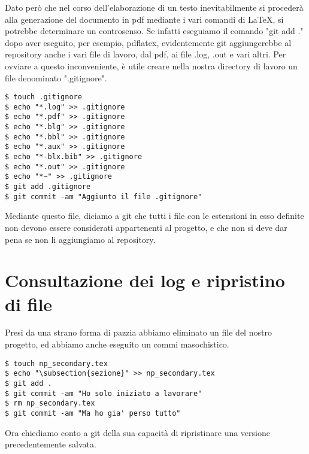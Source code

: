 \documentclass{article}
\begin{document}
Dato però che nel corso dell'elaborazione di un testo inevitabilmente si
procederà alla generazione del documento in pdf mediante i vari comandi di
\LaTeX, si potrebbe determinare un controsenso. Se infatti eseguiamo il comando
"git add ." dopo aver eseguito,
per esempio, pdflatex, evidentemente git aggiungerebbe al repository anche i
vari file di lavoro, dal pdf, ai file .log, .out e vari altri.
Per ovviare a questo inconveniente, è utile creare nella nostra directory di
lavoro un file denominato ".gitignore".

\begin{lstlisting}
$ touch .gitignore
$ echo "*.log" >> .gitignore
$ echo "*.pdf" >> .gitignore
$ echo "*.blg" >> .gitignore
$ echo "*.bbl" >> .gitignore
$ echo "*.aux" >> .gitignore
$ echo "*-blx.bib" >> .gitignore
$ echo "*.out" >> .gitignore
$ echo "*~" >> .gitignore
$ git add .gitignore
$ git commit -am "Aggiunto il file .gitignore"
\end{lstlisting}

Mediante questo file, diciamo a git che tutti i file con le estensioni in esso
definite non devono essere considerati appartenenti al progetto, e che non si
deve dar pena se non li aggiungiamo al repository.

\section{Consultazione dei log e ripristino di file}
Presi da una strano forma di pazzia abbiamo eliminato un file del nostro
progetto, ed abbiamo anche eseguito un commi masochistico.

\begin{lstlisting}
$ touch np_secondary.tex
$ echo "\subsection{sezione}" >> np_secondary.tex
$ git add .
$ git commit -am "Ho solo iniziato a lavorare"
$ rm np_secondary.tex
$ git commit -am "Ma ho gia' perso tutto"
\end{lstlisting}

Ora chiediamo conto a git della sua capacità di ripristinare una versione
precedentemente salvata.
\end{document}

